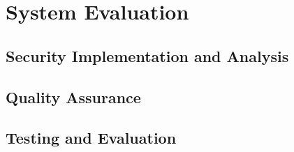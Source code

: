 \chapter{System Evaluation}

\section{Security Implementation and Analysis}

\section{Quality Assurance}

\section{Testing and Evaluation}